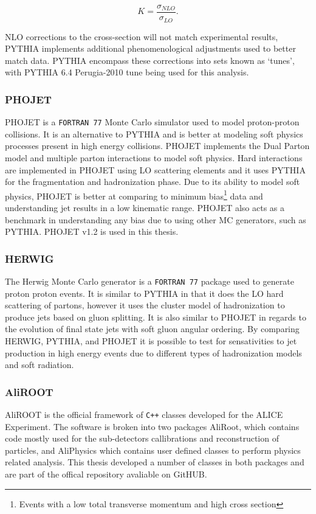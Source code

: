 \begin{equation}
K = \frac{\sigma_{NLO}}{\sigma_{LO}}.
\label{eq:Kfactor}
\end{equation}

NLO corrections to the cross-section will not match experimental results, PYTHIA implements additional phenomenological adjustments used to better match data.  PYTHIA encompass these corrections into sets known as `tunes', with PYTHIA 6.4 Perugia-2010 tune being used for this analysis\cite{Skands:2010ak}.

\subsubsection{PHOJET}
PHOJET is a \verb|FORTRAN 77| Monte Carlo simulator used to model proton-proton collisions. It is an alternative to PYTHIA and is better at modeling soft physics processes present in high energy collisions.   PHOJET implements the Dual Parton model\cite{CAPELLA1994225}\cite{Wong:241251} and multiple parton interactions\cite{Bopp:1998rc} to model soft physics.  Hard interactions are implemented in PHOJET using LO scattering elements and it uses PYTHIA for the fragmentation and hadronization phase.  Due to its ability to model soft physics, PHOJET is better at comparing to minimum bias\footnote{Events with a low total transverse momentum and high cross section} data and understanding jet results in a low kinematic range.  PHOJET also acts as a benchmark in understanding any bias due to using other MC generators, such as PYTHIA.  PHOJET v1.2 is used in this thesis.


\subsubsection{HERWIG}
The Herwig\cite{Bahr:2008pv} Monte Carlo generator is a \verb|FORTRAN 77| package used to generate proton proton events.  It is similar to PYTHIA in that it does the LO hard scattering of partons, however it uses the cluster model of hadronization to produce jets based on gluon splitting.  It is also similar to PHOJET in regards to the evolution of final state jets with soft gluon angular ordering.  By comparing HERWIG, PYTHIA, and PHOJET it is possible to test for sensativities to jet production in high energy events due to different types of hadronization models and soft radiation.

\subsubsection{AliROOT}
AliROOT is the official framework of \verb|C++| classes developed for the ALICE Experiment.  The software is broken into two packages AliRoot, which contains code mostly used for the sub-detectors callibrations and reconstruction of particles, and AliPhysics which contains user defined classes to perform physics related analysis.  This thesis developed a number of classes in both packages and are part of the offical repository avaliable on GitHUB.

